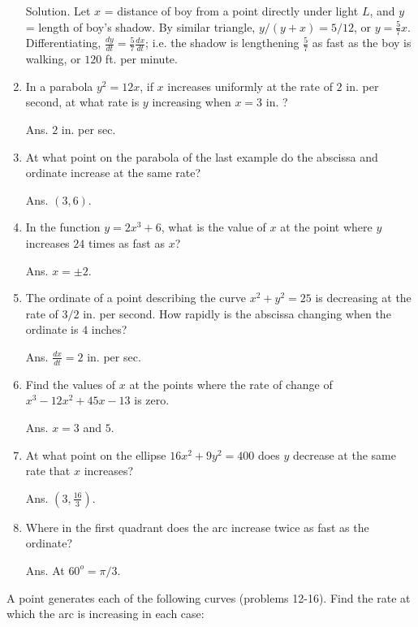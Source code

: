 \begin{enumerate}
Solution. Let $x$ = distance of boy from a point directly 
under light $L$, and $y$ = length of boy's shadow. 
By similar triangle, %
$y/( y + x) = 5/12$,
or $ y 	= \frac{5}{7} x$.
Differentiating, $\frac{dy}{dt} = \frac{5}{7} \frac{dx}{dt}$;
i.e. the shadow is lengthening $\frac{5}{7}$ as fast as 
the boy is walking, or $120$ ft. per minute.

\item
In a parabola $y^2 = 12x$, if $x$ increases uniformly at 
the rate of $2$ in. per second, at what rate is $y$ increasing 
when $x = 3$ in. ? 

Ans. $2$ in. per sec.

\item
At what point on the parabola of the last example do the 
abscissa and ordinate increase at the same rate? 

Ans. $(3,6)$.

\item
In the function $y = 2x^3 + 6$, what is the value of $x$ at the 
point where $y$ increases $24$ times as fast as $x$? 

Ans. $x = \pm 2$.

\item
The ordinate of a point describing the curve 
$x^2 + y^2 = 25$ is decreasing at the rate of $3/2$ in. per second. 
How rapidly is the abscissa changing when the ordinate is $4$ inches? 

Ans. $\frac{dx}{dt} = 2$ in. per sec.

\item
Find the values of $x$ at the points where the rate of change of
$ x^3 - 12x^2 + 45x - 13$
is zero. 

Ans. $x = 3$ and $5$.

\item
At what point on the ellipse $16x^2 + 9y^2 = 400$ does $y$ decrease 
at the same rate that $x$ increases? 

Ans. $(3, \frac{16}{3})$.

\item
Where in the first quadrant does the arc increase twice as 
fast as the ordinate? 

Ans. At $60^o = \pi/3$.

\end{enumerate}

A point generates each of the following curves (problems 12-16). 
Find the rate at which the arc is increasing in each case:

